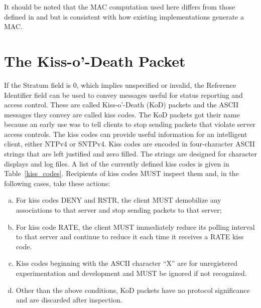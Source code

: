 It should be noted that the MAC computation used here differs from
those defined in \cite{RFC1305} and \cite{RFC4330} but is consistent with how
existing implementations generate a MAC.

\section{The Kiss-o'-Death Packet}
\label{section-7-4}

If the Stratum field is 0, which implies unspecified or invalid, the
Reference Identifier field can be used to convey messages useful for
status reporting and access control. These are called Kiss-o'-Death
(KoD) packets and the ASCII messages they convey are called kiss
codes. The KoD packets got their name because an early use was to
tell clients to stop sending packets that violate server access
controls. The kiss codes can provide useful information for an
intelligent client, either NTPv4 or SNTPv4. Kiss codes are encoded
in four-character ASCII strings that are left justified and zero
filled. The strings are designed for character displays and log
files. A list of the currently defined kiss codes is given in
Table~\ref{kiss_codes}. Recipients of kiss codes MUST inspect them and, in the
following cases, take these actions:

\begin{enumerate}[a.]
  \item For kiss codes DENY and RSTR, the client MUST demobilize any
associations to that server and stop sending packets to that
server;
  \item For kiss code RATE, the client MUST immediately reduce its
polling interval to that server and continue to reduce it each
time it receives a RATE kiss code.
  \item Kiss codes beginning with the ASCII character ``X'' are for
unregistered experimentation and development and MUST be ignored
if not recognized.
  \item Other than the above conditions, KoD packets have no protocol
significance and are discarded after inspection.
\end{enumerate}

